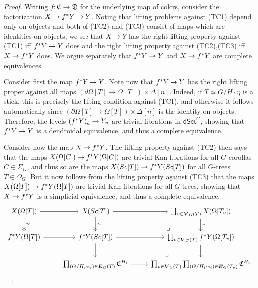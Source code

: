 \documentclass[a4paper,10pt
,draft
]{article}%
\numberwithin{equation}{section}
\numberwithin{figure}{section}
\theoremstyle{definition} %
\newcommand{\1}{\ensuremath{\mathbbm 1}}%
\begin{document}
\begin{proof}
Writing $f \colon \mathfrak{C} \to \mathfrak{D}$ for the underlying map of colors,
consider the factorization $X \to f^{\**}Y \to Y$.
%
Noting that lifting problems against (TC1) depend only on objects and both of (TC2) and (TC3) consist of maps which are identities on objects,
we see that $X \to Y$ has the right lifting property against (TC1) iff 
$f^{\**} Y \to Y$ does
and the right lifting property against 
(TC2),(TC3) iff $X \to f^{\**}Y$ does.
We argue separately that 
$f^{\**} Y \to Y$ and $X \to f^{\**}Y$
are complete equivalences.

Consider first the map $f^{\**} Y \to Y$. Note now that $f^{\**} Y \to Y$ has the right lifting proper against all maps 
$\left(\partial \Omega[T] \to \Omega[T] \right) \times \Delta[n]$.
Indeed, if $T \simeq G/H \cdot \eta$ is a stick, this is precisely the lifting condition against (TC1), and otherwise it follows automatically since $\left(\partial \Omega[T] \to \Omega[T] \right) \times \Delta[n]$ is the identity on objects.
Therefore, the levels 
$\left(f^{\**} Y \right)_n \to Y_n$ are trivial fibrations in 
$\mathsf{dSet}^G$, showing that 
$f^{\**} Y \to Y$ is a dendroidal equivalence, 
and thus a complete equivalence. 


Consider now the map $X \to f^{\**} Y$.
The lifting property against (TC2) then says that the maps
$X(\Omega[C]) \to f^{\**} Y (\Omega[C])$
are trivial Kan fibrations for all $G$-corollas $C \in \Sigma_G$,
and thus so are the maps
$X(Sc[T]) \to f^{\**} Y (Sc[T])$ for all $G$-trees $T \in \Omega_G$.
But it now follows from the lifting property against
(TC3) that the maps 
$X(\Omega[T]) \to f^{\**} Y (\Omega[T])$
are trivial Kan fibrations for all $G$-trees,
showing that $X \to f^{\**} Y$ is a simplicial equivalence, and thus a complete equivalence. 
\[
\begin{tikzcd}
X(\Omega[T]) \ar{r} \ar[->>]{d}{\sim} &
X(Sc[T]) \ar{r} \ar[->>]{d}{\sim} &
\prod_{v \in \boldsymbol{V}_G(T)} X(\Omega[T_v])
\ar[->>]{d}{\sim}
\\
f^{\**} Y(\Omega[T]) \ar{r} &
f^{\**} Y(Sc[T]) \ar{r} \ar{d} &
\prod_{v \in \boldsymbol{V}_G(T)} f^{\**} Y
(\Omega[T_v]) \ar{d}
\arrow[ul, phantom, "\lrcorner", very near start]
\\
&
\prod_{(G/H_i \cdot e_i) \in \boldsymbol{E}_G(T)} 
\mathfrak{C}^{H_i} \ar{r}  &
\prod_{v \in \boldsymbol{V}_G(T)}
\prod_{(G/H_i \cdot e_i) \in \boldsymbol{E}_G(T_v)} 
\mathfrak{C}^{H_i} 
\arrow[ul, phantom, "\lrcorner", very near start]
\end{tikzcd}
\]
\end{proof}
\end{document}
